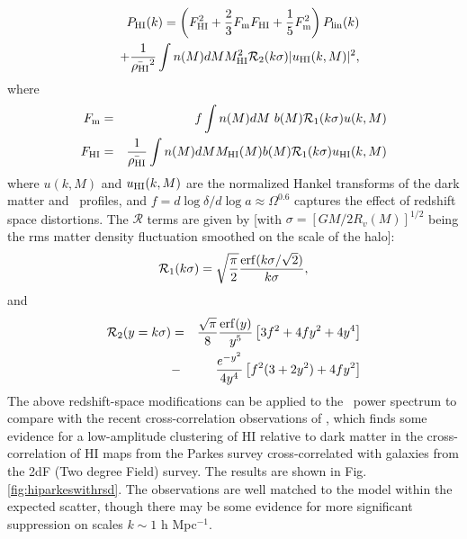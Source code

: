 \begin{eqnarray}
& &P_{\rm HI}(k) = \left( F_{\rm HI}^2+{2\over 3}F_{\rm m}F_{\rm HI} + {1\over 5}F_{\rm m}^2\right)P_{\rm lin}(k)
   \\
& & + 
{1 \over  \bar{\rho_{\rm HI}}^2}
\int n(M) dM {M_{\rm HI}^2}
{\cal R}_2(k\sigma) |u_{\rm HI}(k,M)|^2,
\nonumber
\label{rs}
\end{eqnarray}
where 
\begin{eqnarray}
F_{\rm m}&=&f\int n(M) dM \ b(M) {\cal R}_1(k\sigma) u(k, M) 
\nonumber \\
F_{\rm HI}&=&
{{1}\over \bar{\rho_{\rm HI}}} \int
n(M) d M  M_{\rm HI} (M) b(M) {\cal R}_1(k\sigma)u_{\rm HI} (k,M)
\label{p0}
\end{eqnarray}
where $u(k,M)$ and $u_{\rm HI}(k,M)$ are the normalized Hankel transforms of the dark matter and \HI\ profiles, and
$f = d \log \delta/ d \log a \approx \Omega^{0.6}$ captures the effect of redshift space distortions.
The $\mathcal{R}$ terms are given by [with $\sigma = [GM/2R_v(M)]^{1/2}$ being the rms matter density fluctuation smoothed on the scale of the halo]:
\begin{equation}
  {\cal R}_1(k\sigma) = \sqrt{\pi\over 2} { {\rm erf}(k \sigma/\sqrt{2})\over k \sigma},
\label{r2}
\end{equation}
and
\begin{eqnarray}
  {\cal R}_2(y=k\sigma) &=& {\sqrt{\pi}\over 8} { {\rm erf}(y)\over y^5}
    \left[ 3f^2+4fy^2+4y^4 \right] \nonumber \nonumber \\
  &-& {e^{-y^2}\over 4y^4}\left[ f^2(3+2y^2)+4fy^2 \right]
\end{eqnarray}
\label{r2}
The  above redshift-space modifications can be applied to the \HI\ power spectrum to compare with the recent cross-correlation observations of \cite{anderson2018}, which finds some evidence for a low-amplitude clustering of HI relative to dark matter in the cross-correlation of HI maps from the Parkes survey cross-correlated with galaxies from the 2dF (Two degree Field) survey. The results are shown in Fig. \ref{fig:hiparkeswithrsd}. The observations are well matched to the model within the expected scatter, though there may be some evidence for more significant suppression on scales $k \sim 1$ h Mpc$^{-1}$.


